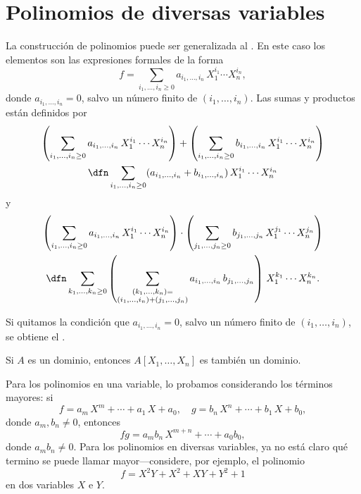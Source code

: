 
\section{Polinomios de diversas variables}

La construcción de polinomios puede ser generalizada al
.
En este caso los elementos son las expresiones formales de la forma
$$f = \sum_{i_1,\ldots,i_n \ge 0} a_{i_1,\ldots,i_n}\,X_1^{i_1}\cdots X_n^{i_n},$$
donde $a_{i_1,\ldots,i_n} = 0$, salvo un número finito de
$(i_1,\ldots,i_n)$. Las sumas y productos están definidos por
\begin{multline*}
  \left(\sum_{i_1,\ldots,i_n \ge 0} a_{i_1,\ldots,i_n}\,X_1^{i_1}\cdots X_n^{i_n}\right) + \left(\sum_{i_1,\ldots,i_n \ge 0} b_{i_1,\ldots,i_n}\,X_1^{i_1}\cdots X_n^{i_n}\right) \\
  \dfn \sum_{i_1,\ldots,i_n \ge 0} (a_{i_1,\ldots,i_n} + b_{i_1,\ldots,i_n})\,X_1^{i_1}\cdots X_n^{i_n}
\end{multline*}
y
\begin{multline*}
  \left(\sum_{i_1,\ldots,i_n \ge 0} a_{i_1,\ldots,i_n}\,X_1^{i_1}\cdots X_n^{i_n}\right) \cdot \left(\sum_{j_1,\ldots,j_n \ge 0} b_{j_1,\ldots,j_n}\,X_1^{j_1}\cdots X_n^{j_n}\right) \\
  \dfn \sum_{k_1,\ldots,k_n \ge 0} \left(\sum_{\substack{(k_1,\ldots,k_n) = \\ (i_1,\ldots,i_n) + (j_1,\ldots,j_n)}} a_{i_1,\ldots,i_n}\,b_{j_1,\ldots,j_n}\right)\,X_1^{k_1}\cdots X_n^{k_n}.
\end{multline*}

Si quitamos la condición que $a_{i_1,\ldots,i_n} = 0$, salvo un número finito de
$(i_1,\ldots,i_n)$, se obtiene el .

\begin{proposicion}
  \label{prop:A[X1...Xn]-dominio}
  Si $A$ es un dominio, entonces $A [X_1,\ldots,X_n]$ es también un dominio.
\end{proposicion}

Para los polinomios en una variable, lo probamos considerando los términos
mayores: si
$$f = a_m\,X^m + \cdots + a_1\,X + a_0, \quad g = b_n\,X^n + \cdots + b_1\,X + b_0,$$
donde $a_m, b_n \ne 0$, entonces
$$fg = a_m b_n \, X^{m+n} + \cdots + a_0 b_0,$$
donde $a_m b_n \ne 0$. Para los polinomios en diversas variables, ya no está
claro qué termino se puede llamar mayor---considere, por ejemplo, el polinomio
$$f = X^2 Y + X^2 + XY + Y^2 + 1$$
en dos variables $X$ e $Y$.

